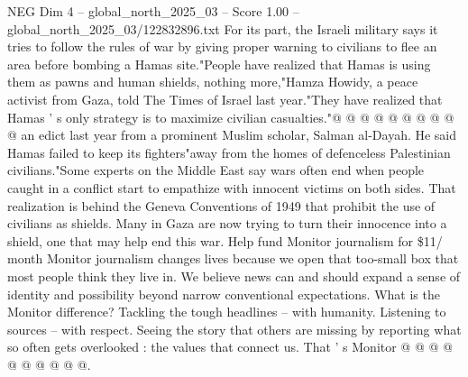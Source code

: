 \begin{textsample}{NEG Dim 4 – global\_north\_2025\_03 – Score 1.00 – global\_north\_2025\_03/122832896.txt}
For its part, the Israeli military says it tries to follow the rules of war by giving proper warning to civilians to flee an area before bombing a Hamas site."People have realized that Hamas is using them as pawns and human shields, nothing more,"Hamza Howidy, a peace activist from Gaza, told The Times of Israel last year."They have realized that Hamas ' s only strategy is to maximize civilian casualties."@ @ @ @ @ @ @ @ @ @ an edict last year from a prominent Muslim scholar, Salman al-Dayah.
He said Hamas failed to keep its fighters"away from the homes of defenceless Palestinian civilians."Some experts on the Middle East say wars often end when people caught in a conflict start to empathize with innocent victims on both sides.
That realization is behind the Geneva Conventions of 1949 that prohibit the use of civilians as shields.
Many in Gaza are now trying to turn their innocence into a shield, one that may help end this war.
Help fund Monitor journalism for \$11/ month Monitor journalism changes lives because we open that too-small box that most people think they live in.
We believe news can and should expand a sense of identity and possibility beyond narrow conventional expectations.
What is the Monitor difference?
Tackling the tough headlines -- with humanity.
Listening to sources -- with respect.
Seeing the story that others are missing by reporting what so often gets overlooked : the values that connect us.
That ' s Monitor @ @ @ @ @ @ @ @ @ @.

\end{textsample}
